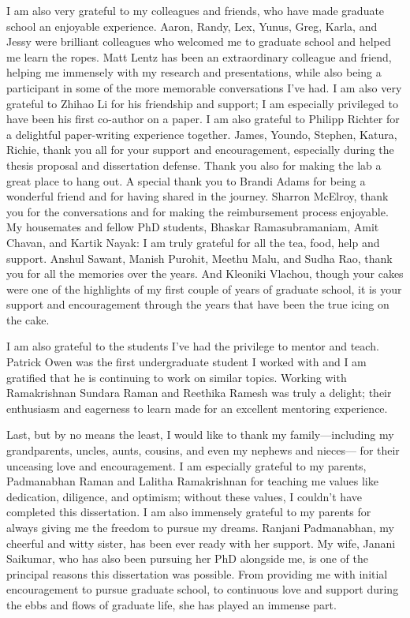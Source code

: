 I am also very grateful to my colleagues and friends, who have made graduate school an enjoyable experience. Aaron, Randy, Lex, Yunus, Greg, Karla, and Jessy were brilliant colleagues who welcomed me to graduate school and helped me learn the ropes. Matt Lentz has been an extraordinary colleague and friend, helping me immensely with my research and presentations, while also being a participant in some of the more memorable conversations I’ve had. I am also very grateful to Zhihao Li for his friendship and support; I am especially privileged to have been his first co-author on a paper. I am also grateful to Philipp Richter for a delightful paper-writing experience together. James, Youndo, Stephen, Katura, Richie, thank you all for your support and encouragement, especially during the thesis proposal and dissertation defense. Thank you also for making the lab a great place to hang out. A special thank you to Brandi Adams for being a wonderful friend and for having shared in the journey. Sharron McElroy, thank you for the conversations and for making the reimbursement process enjoyable. My housemates and fellow PhD students, Bhaskar Ramasubramaniam, Amit Chavan, and Kartik Nayak: I am truly grateful for all the tea, food, help and support. Anshul Sawant, Manish Purohit, Meethu Malu, and Sudha Rao, thank you for all the memories over the years. And Kleoniki Vlachou, though your cakes were one of the highlights of my first couple of years of graduate school, it is your support and encouragement through the years that have been the true icing on the cake. 

I am also grateful to the students I’ve had the privilege to mentor and teach. Patrick Owen was the first undergraduate student I worked with and I am gratified that he is continuing to work on similar topics. Working with Ramakrishnan Sundara Raman and Reethika Ramesh was truly a delight; their enthusiasm and eagerness to learn made for an excellent mentoring experience. 

Last, but by no means the least, I would like to thank my family---including my grandparents, uncles, aunts, cousins, and even my nephews and nieces--- for their unceasing love and encouragement. I am especially grateful to my parents, Padmanabhan Raman and Lalitha Ramakrishnan for teaching me values like dedication, diligence, and optimism; without these values, I couldn’t have completed this dissertation. I am also immensely grateful to my parents for always giving me the freedom to pursue my dreams. Ranjani Padmanabhan, my cheerful and witty sister, has been ever ready with her support. My wife, Janani Saikumar, who has also been pursuing her PhD alongside me, is one of the principal reasons this dissertation was possible. From providing me with initial encouragement to pursue graduate school, to continuous love and support during the ebbs and flows of graduate life, she has played an immense part.
